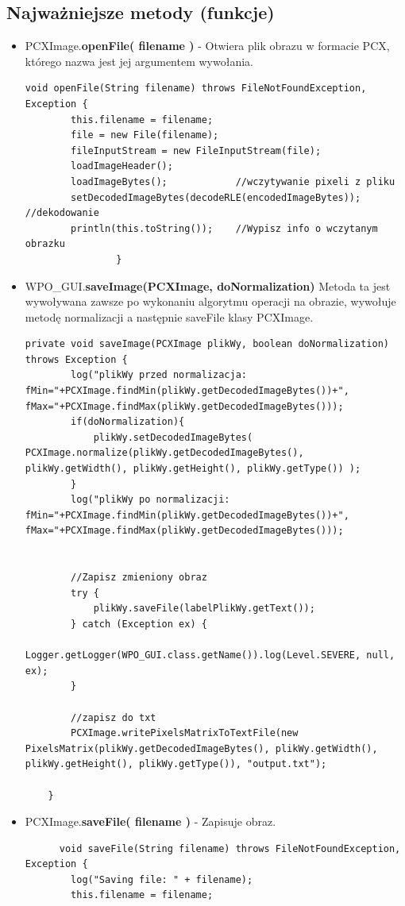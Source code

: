 \documentclass{article}
\begin{document}
\subsection{Najważniejsze metody (funkcje)}
\begin{itemize}
\item PCXImage.\textbf{openFile( filename )} - Otwiera plik obrazu w formacie PCX, którego nazwa jest jej argumentem wywołania.  
\begin{verbatim}
void openFile(String filename) throws FileNotFoundException, Exception {
        this.filename = filename;
        file = new File(filename);
        fileInputStream = new FileInputStream(file);
        loadImageHeader();
        loadImageBytes();            //wczytywanie pixeli z pliku
        setDecodedImageBytes(decodeRLE(encodedImageBytes));   //dekodowanie
        println(this.toString());    //Wypisz info o wczytanym obrazku
				}
\end{verbatim}

\item WPO\_GUI.\textbf{saveImage(PCXImage, doNormalization)}
Metoda ta jest wywoływana zawsze po wykonaniu algorytmu operacji na obrazie, wywołuje metodę normalizacji a następnie saveFile klasy PCXImage. 
\begin{verbatim}
private void saveImage(PCXImage plikWy, boolean doNormalization) throws Exception {
        log("plikWy przed normalizacja: fMin="+PCXImage.findMin(plikWy.getDecodedImageBytes())+", fMax="+PCXImage.findMax(plikWy.getDecodedImageBytes()));
        if(doNormalization){
            plikWy.setDecodedImageBytes( PCXImage.normalize(plikWy.getDecodedImageBytes(), plikWy.getWidth(), plikWy.getHeight(), plikWy.getType()) );
        }
        log("plikWy po normalizacji: fMin="+PCXImage.findMin(plikWy.getDecodedImageBytes())+", fMax="+PCXImage.findMax(plikWy.getDecodedImageBytes()));
        
       
        //Zapisz zmieniony obraz
        try {
            plikWy.saveFile(labelPlikWy.getText());
        } catch (Exception ex) {
            Logger.getLogger(WPO_GUI.class.getName()).log(Level.SEVERE, null, ex);
        }
        
        //zapisz do txt
        PCXImage.writePixelsMatrixToTextFile(new PixelsMatrix(plikWy.getDecodedImageBytes(), plikWy.getWidth(), plikWy.getHeight(), plikWy.getType()), "output.txt");
        
    }
\end{verbatim}

\item PCXImage.\textbf{saveFile( filename )} - Zapisuje obraz.
	\begin{verbatim}
	  void saveFile(String filename) throws FileNotFoundException, Exception {
        log("Saving file: " + filename);
        this.filename = filename;


\end{verbatim}
\end{itemize}
\end{document}
